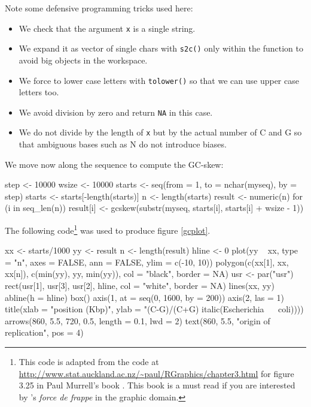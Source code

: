 \documentclass{article}
\begin{document}
Note some defensive programming tricks used here:

\begin{itemize}
\item We check that the argument \texttt{x} is a single string.
\item We expand it as vector of single chars with \texttt{s2c()} only within the
      function to avoid big objects in the workspace.
\item We force to lower case letters with \texttt{tolower()} so that we can use 
      upper case letters too.
\item We avoid division by zero and return \texttt{NA} in this case.
\item We do not divide by the length of \texttt{x} but by the actual number
      of C and G so that ambiguous bases such as N do not introduce biases.
\end{itemize}


We move now along the sequence to compute the GC-skew:

\begin{Schunk}
\begin{Sinput}
 step <- 10000
 wsize <- 10000
 starts <- seq(from = 1, to = nchar(myseq), by = step)
 starts <- starts[-length(starts)]
 n <- length(starts)
 result <- numeric(n)
 for (i in seq_len(n)) {
     result[i] <- gcskew(substr(myseq, starts[i], starts[i] + 
         wsize - 1))
 }
\end{Sinput}
\end{Schunk}

The following code\footnote{
This code is adapted from the code at \url{http://www.stat.auckland.ac.nz/~paul/RGraphics/chapter3.html} for
figure 3.25 in Paul Murrell's book \cite{MurrellP2005}. This book is a must read if you are interested
by \Rlogo{}'s \textit{force de frappe} in the graphic domain. 
} was used to produce figure \ref{gcplot}.

\begin{Schunk}
\begin{Sinput}
 xx <- starts/1000
 yy <- result
 n <- length(result)
 hline <- 0
 plot(yy ~ xx, type = "n", axes = FALSE, ann = FALSE, ylim = c(-10, 
     10))
 polygon(c(xx[1], xx, xx[n]), c(min(yy), yy, min(yy)), col = "black", 
     border = NA)
 usr <- par("usr")
 rect(usr[1], usr[3], usr[2], hline, col = "white", border = NA)
 lines(xx, yy)
 abline(h = hline)
 box()
 axis(1, at = seq(0, 1600, by = 200))
 axis(2, las = 1)
 title(xlab = "position (Kbp)", ylab = "(C-G)/(C+G) %
     italic(Escherichia ~ ~coli))))
 arrows(860, 5.5, 720, 0.5, length = 0.1, lwd = 2)
 text(860, 5.5, "origin of replication", pos = 4)
\end{Sinput}
\end{Schunk}
\end{document}
